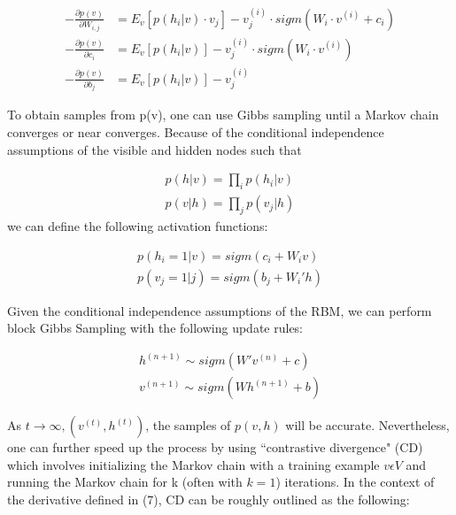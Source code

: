 \documentclass[journal]{IEEEtran}
\begin{document}
\begin{equation}
\begin{aligned}
- \frac{\partial p(v)}{\partial W_{i,j}} &= E_{v}[p(h_{i}|v)\cdot v_{j}] - v_{j}^{(i)}\cdot sigm(W_{i} \cdot v^{(i)} + c_{i})\\
- \frac{\partial p(v)}{\partial c_{i}} &= E_{v}[p(h_{i}|v)] - v_{j}^{(i)}\cdot sigm(W_{i} \cdot v^{(i)})\\
- \frac{\partial p(v)}{\partial b_{j}} &= E_{v}[p(h_{i}|v)] - v_{j}^{(i)}
\end{aligned}
\end{equation}

To obtain samples from p(v), one can use Gibbs sampling until a Markov chain converges or near converges.  Because of the conditional independence assumptions of the visible and hidden nodes such that 

\begin{equation}
\begin{aligned}
p(h|v) = \prod\limits_{i} p(h_{i}|v)\\
p(v|h) = \prod\limits_{j} p(v_{j}|h)
\end{aligned}
\end{equation} we can define the following activation functions:

\begin{equation}
\begin{aligned}
p(h_{i} = 1|v) = sigm(c_{i} + W_{i}v)\\
p(v_{j} = 1|j) = sigm(b_{j} + W_{i}'h)
\end{aligned}
\end{equation}

Given the conditional independence assumptions of the RBM, we can perform block Gibbs Sampling with the following update rules:

\begin{equation}
\begin{aligned}
h^{(n+1)} \sim sigm(W'v^{(n)} + c)\\
v^{(n+1)} \sim sigm(Wh^{(n+1)} + b)
\end{aligned}
\end{equation}

As $t \rightarrow \infty,  (v^{(t)},h^{(t)})$, the samples of $p(v,h)$ will be accurate.  Nevertheless, one can further speed up the process by using ``contrastive divergence" (CD) which involves initializing the Markov chain with a training example $v \epsilon V$ and running the Markov chain for k (often with $k = 1$) iterations.  In the context of the derivative defined in (7), CD can be roughly outlined as the following:
\end{document}
